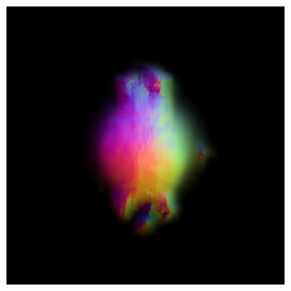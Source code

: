 \begin{figure}[ht]
    \centering
    \begin{subfigure}[b]{0.20\textwidth}
        \centering
        \fontsize{9pt}{7pt}\selectfont{}\vspace{3cm}
        \fontsize{9pt}{7pt}\selectfont{}\vspace{2.85cm}
        \fontsize{9pt}{7pt}\selectfont{}\vspace{1.95cm}
    \end{subfigure}
    \begin{subfigure}[b]{0.20\textwidth}
        \centering
        \includegraphics[width=\textwidth]{etc/a robot made out of plants/dreamfusion/dreamfusion_plantrobot_1_part2.png}

\end{subfigure}
\end{figure}

